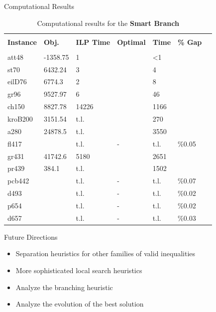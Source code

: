 \begin{frame}[t]{Computational Results}
    \begin{table}
        \begin{center}
            \resizebox{.75\textwidth}{!}
            {
                \begin{tabular}{l l l l l l l}
                    \hline \\
                    \textbf{Instance}	&	\textbf{Obj.}	&	\textbf{ILP Time}	&	\textbf{Optimal}	&	\textbf{Time}	&	\textbf{\% Gap}	& \\
                    \hline \\
                    att48		&	-1358.75		&	1		&	\checkmark	&	<1		&			&	\\
                    st70		&	6432.24	&	3		&	\checkmark	&	4		&			&	\\
                    eilD76		&	6774.3		&	2		&	\checkmark	&	8		&			&	\\
                    gr96		&	9527.97	&	6		&	\checkmark	&	46		&			&	\\
                    ch150		&	8827.78	&	14226	&	\checkmark	&	1166	&			&	\\
                    kroB200		&	3151.54	&	t.l.	&	\checkmark	&	270		&			&	\\
                    a280		&	24878.5	&	t.l.	&	\checkmark	&	3550	&			&	\\
                    fl417		&				&	t.l.	&	-			&	t.l.	&	\%0.05	&	\\
                    gr431		&	41742.6	&	5180	&	\checkmark	&	2651	&			&	\\
                    pr439		&	384.1		&	t.l.	&	\checkmark	&	1502	&			&	\\
                    pcb442		&				&	t.l.	&	-			&	t.l.	&	\%0.07	&	\\
                    d493		&				&	t.l.	&	-			&	t.l.	&	\%0.02	&	\\
                    p654		&				&	t.l.	&	-			&	t.l.	&	\%0.02	&	\\
                    d657		&				&	t.l.	&	-			&	t.l.	&	\%0.03	&	\\
                    \hline
                \end{tabular} }
            \caption{Computational results for the \textbf{Smart Branch}} \label{tbl:results3}
        \end{center}
    \end{table}
\end{frame}

\begin{frame}[t]{Future Directions}
    \begin{itemize}
        \item<1-> Separation heuristics for other families of valid inequalities
        \item<2-> More sophisticated local search heuristics
        \item<3-> Analyze the branching heuristic
        \item<4-> Analyze the evolution of the best solution
    \end{itemize}
\end{frame}


